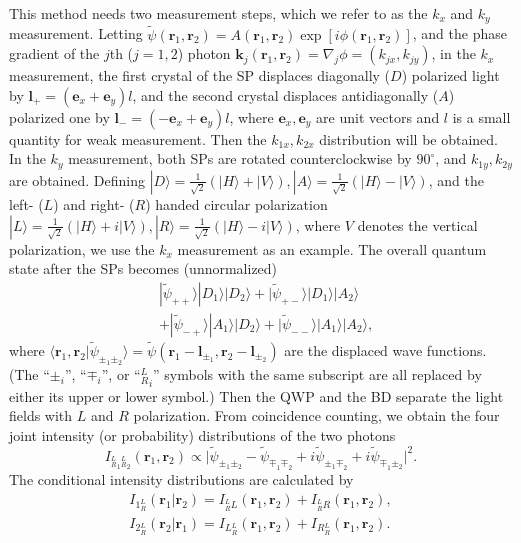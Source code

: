 \documentclass[pra,english,reprint,nofootinbib,aps,superscriptaddress,showpacs,showkeys]{revtex4-2}
\theoremstyle{definition}
\theoremstyle{remark}
\begin{document}
	This method needs two measurement steps, which we refer to as the $k_x$ and $k_y$ measurement. Letting $\tilde{\psi}(\mathbf{r}_1,\mathbf{r}_2)=A(\mathbf{r}_1,\mathbf{r}_2)\exp[i\phi(\mathbf{r}_1,\mathbf{r}_2)]$, and the phase gradient of the $j$th ($j=1,2$) photon $\mathbf{k}_j(\mathbf{r}_1,\mathbf{r}_2)=\nabla_j\phi=(k_{jx},k_{jy})$, in the $k_x$ measurement, the first crystal of the SP displaces diagonally ($D$) polarized light by $\mathbf{l}_+=(\mathbf{e}_x+\mathbf{e}_y)l$, and the second crystal displaces antidiagonally ($A$) polarized one by $\mathbf{l}_-=(-\mathbf{e}_x+\mathbf{e}_y)l$, where $\mathbf{e}_x,\mathbf{e}_y$ are unit vectors and $l$ is a small quantity for weak measurement. Then the $k_{1x},k_{2x}$ distribution will be obtained. In the $k_y$ measurement, both SPs are rotated counterclockwise by $90^\circ$, and $k_{1y},k_{2y}$ are obtained. Defining $|D\rangle=\frac{1}{\sqrt{2}}(|H\rangle+|V\rangle),|A\rangle=\frac{1}{\sqrt{2}}(|H\rangle-|V\rangle)$, and the left- ($L$) and right- ($R$) handed circular polarization $|L\rangle=\frac{1}{\sqrt{2}}(|H\rangle+i|V\rangle),|R\rangle=\frac{1}{\sqrt{2}}(|H\rangle-i|V\rangle)$, where $V$ denotes the vertical polarization, we use the $k_x$ measurement as an example. The overall quantum state after the SPs becomes (unnormalized)
	\begin{align}
		&|\tilde{\psi}_{++}\rangle|D_1\rangle|D_2\rangle+|\tilde{\psi}_{+-}\rangle|D_1\rangle|A_2\rangle\nonumber\\
		&+|\tilde{\psi}_{-+}\rangle|A_1\rangle|D_2\rangle+|\tilde{\psi}_{--}\rangle|A_1\rangle|A_2\rangle,
	\end{align}
	where $\langle\mathbf{r}_1,\mathbf{r}_2|\tilde{\psi}_{\pm_1\pm_2}\rangle=\tilde{\psi}(\mathbf{r}_1-\mathbf{l}_{\pm_1},\mathbf{r}_2-\mathbf{l}_{\pm_2})$ are the displaced wave functions. (The ``$\pm_i$'', ``$\mp_i$'', or ``${^L_R}_i$'' symbols with the same subscript are all replaced by either its upper or lower symbol.) Then the QWP and the BD separate the light fields with $L$ and $R$ polarization. From coincidence counting, we obtain the four joint intensity (or probability) distributions of the two photons
	\begin{equation}\label{intdist}
		I_{{^L_R}_1{^L_R}_2}(\mathbf{r}_1,\mathbf{r}_2)\propto\big|\tilde{\psi}_{\pm_1\pm_2}-\tilde{\psi}_{\mp_1\mp_2}+i\tilde{\psi}_{\pm_1\mp_2}+i\tilde{\psi}_{\mp_1\pm_2}\big|^2.
	\end{equation}
	The conditional intensity distributions are calculated by
	\begin{gather}
		I_{1{^L_R}}(\mathbf{r}_1|\mathbf{r}_2)=I_{{^L_R}L}(\mathbf{r}_1,\mathbf{r}_2)+I_{{^L_R}R}(\mathbf{r}_1,\mathbf{r}_2),\nonumber\\
		I_{2{^L_R}}(\mathbf{r}_2|\mathbf{r}_1)=I_{L{^L_R}}(\mathbf{r}_1,\mathbf{r}_2)+I_{R{^L_R}}(\mathbf{r}_1,\mathbf{r}_2).
	\end{gather}
\end{document}

